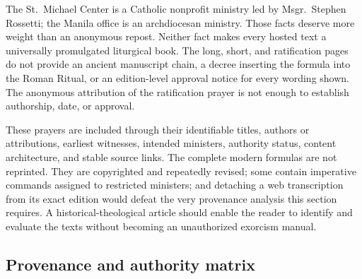 The St.~Michael Center is a Catholic nonprofit ministry led by Msgr.~Stephen Rossetti; the Manila office is an archdiocesan ministry.  Those facts deserve more weight than an anonymous repost.  Neither fact makes every hosted text a universally promulgated liturgical book.  The long, short, and ratification pages do not provide an ancient manuscript chain, a decree inserting the formula into the Roman Ritual, or an edition-level approval notice for every wording shown.  The anonymous attribution of the ratification prayer is not enough to establish authorship, date, or approval.

These prayers are included through their identifiable titles, authors or attributions, earliest witnesses, intended ministers, authority status, content architecture, and stable source links.  The complete modern formulas are not reprinted.  They are copyrighted and repeatedly revised; some contain imperative commands assigned to restricted ministers; and detaching a web transcription from its exact edition would defeat the very provenance analysis this section requires.  A historical-theological article should enable the reader to identify and evaluate the texts without becoming an unauthorized exorcism manual.

\subsection{Provenance and authority matrix}

